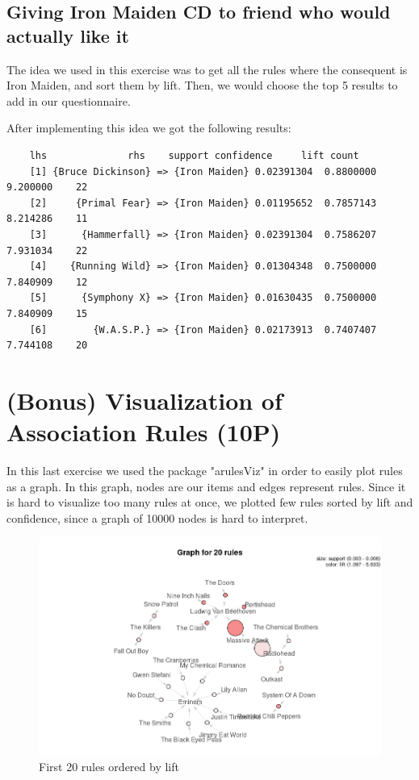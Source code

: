 \documentclass[a4paper]{article}
\begin{document}
	\subsection{Giving Iron Maiden CD to friend who would actually like it}
	\par\noindent The idea we used in this exercise was to get all the rules where the consequent is Iron Maiden, and sort them by lift. Then, we would choose the top 5 results to add in our questionnaire.
	\par\noindent After implementing this idea we got the following results:
	\begin{lstlisting}
	lhs              rhs    support confidence     lift count
	[1] {Bruce Dickinson} => {Iron Maiden} 0.02391304  0.8800000 9.200000    22
	[2]     {Primal Fear} => {Iron Maiden} 0.01195652  0.7857143 8.214286    11
	[3]      {Hammerfall} => {Iron Maiden} 0.02391304  0.7586207 7.931034    22
	[4]    {Running Wild} => {Iron Maiden} 0.01304348  0.7500000 7.840909    12
	[5]      {Symphony X} => {Iron Maiden} 0.01630435  0.7500000 7.840909    15
	[6]        {W.A.S.P.} => {Iron Maiden} 0.02173913  0.7407407 7.744108    20
	\end{lstlisting}
	
	
	\section{(Bonus) Visualization of Association Rules (10P)}
	
	In this last exercise we used the package "arulesViz" in order to easily plot rules as a graph. In this graph, nodes are our items and edges represent rules. Since it is hard to visualize too many rules at once, we plotted few rules sorted by lift and confidence, since a graph of 10000 nodes is hard to interpret. 
	
	\pagebreak
	\begin{center}
		\begin{figure}[!ht]
			\includegraphics[width=\textwidth]{images/plot1.png}
			\caption{First 20 rules ordered by lift}
		\end{figure}
	\end{center}
	
\end{document}
